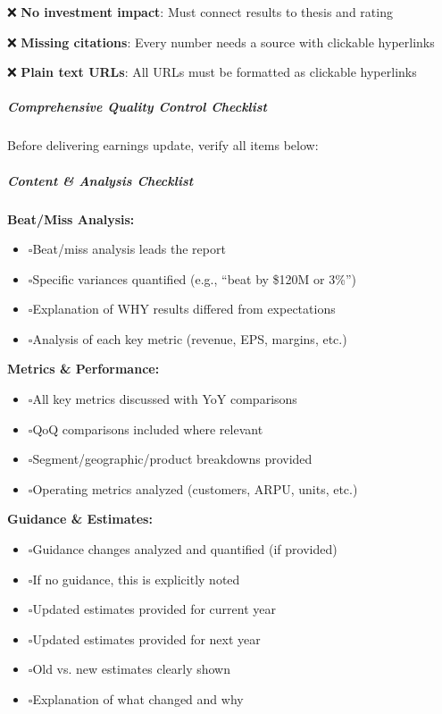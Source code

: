 \documentclass[11pt]{article}
\newcommand{\UncheckedBox}{$\square$}
\begin{document}
❌ \textbf{No investment impact}: Must connect results to thesis and rating


❌ \textbf{Missing citations}: Every number needs a source with clickable hyperlinks


❌ \textbf{Plain text URLs}: All URLs must be formatted as clickable hyperlinks


\subparagraph{Comprehensive Quality Control Checklist}\mbox{}\par

Before delivering earnings update, verify all items below:


\subparagraph{Content \& Analysis Checklist}\mbox{}\par

\textbf{Beat/Miss Analysis:}

\begin{itemize}[leftmargin=*,itemsep=2pt,topsep=2pt]
\item {} \UncheckedBox Beat/miss analysis leads the report
\item {} \UncheckedBox Specific variances quantified (e.g., ``beat by \$120M or 3\%'')
\item {} \UncheckedBox Explanation of WHY results differed from expectations
\item {} \UncheckedBox Analysis of each key metric (revenue, EPS, margins, etc.)
\end{itemize}

\textbf{Metrics \& Performance:}

\begin{itemize}[leftmargin=*,itemsep=2pt,topsep=2pt]
\item {} \UncheckedBox All key metrics discussed with YoY comparisons
\item {} \UncheckedBox QoQ comparisons included where relevant
\item {} \UncheckedBox Segment/geographic/product breakdowns provided
\item {} \UncheckedBox Operating metrics analyzed (customers, ARPU, units, etc.)
\end{itemize}

\textbf{Guidance \& Estimates:}

\begin{itemize}[leftmargin=*,itemsep=2pt,topsep=2pt]
\item {} \UncheckedBox Guidance changes analyzed and quantified (if provided)
\item {} \UncheckedBox If no guidance, this is explicitly noted
\item {} \UncheckedBox Updated estimates provided for current year
\item {} \UncheckedBox Updated estimates provided for next year
\item {} \UncheckedBox Old vs. new estimates clearly shown
\item {} \UncheckedBox Explanation of what changed and why
\end{itemize}
\end{document}

